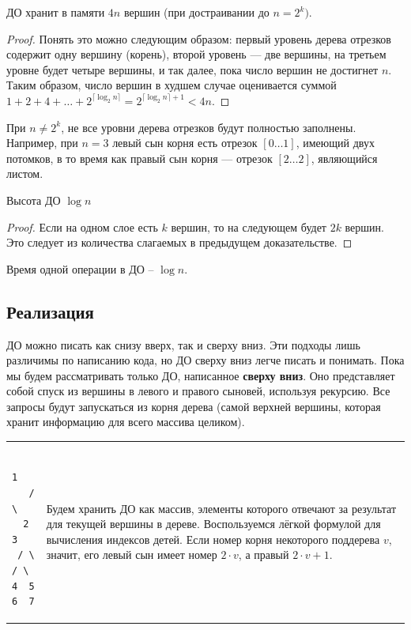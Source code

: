 \begin{Thm}\label{thm@splay}
	ДО хранит в памяти $4n$ вершин (при достраивании до $n=2^k)$.\end{Thm}
\begin{proof}
	Понять это можно следующим образом: первый уровень дерева отрезков содержит одну вершину (корень), второй уровень — две вершины, на третьем уровне будет четыре вершины, и так далее, пока число вершин не достигнет $n$. Таким образом, число вершин в худшем случае оценивается суммой 
	$1 + 2 + 4 + \dots + 2^{\lceil\log_2 n\rceil} = 2^{\lceil\log_2 n\rceil + 1} < 4n$.
\end{proof}

\begin{Rem}При $n \ne 2^k$, не все уровни дерева отрезков будут полностью заполнены. Например, при $n=3$ левый сын корня есть отрезок $[0 \ldots 1]$, имеющий двух потомков, в то время как правый сын корня — отрезок $[2 \ldots 2]$, являющийся листом.
\end{Rem}

\begin{Thm}\label{thm@splay}
	Высота ДО $\log n$\end{Thm}
\begin{proof}
	Если на одном слое есть $k$ вершин, то на следующем будет $2k$ вершин.
	Это следует из количества слагаемых в предыдущем доказательстве.
\end{proof}

\begin{Cons}Время одной операции в ДО -- $\log n$.\end{Cons}

\pagebreak
\up\up\up
\subsection{Реализация}

ДО можно писать как снизу вверх, так и сверху вниз. Эти подходы лишь различимы по написанию кода, но ДО сверху вниз легче писать и понимать. Пока мы будем рассматривать только ДО, написанное {\bf сверху вниз}. Оно представляет собой спуск из вершины в левого и правого сыновей, используя рекурсию. Все запросы будут запускаться из корня дерева (самой верхней вершины, которая хранит информацию для всего массива целиком).

\down
\begin{tabular}{m{}m{}}
	\begin{minipage}{\textwidth}
\begin{verbatim}
    1  
   / \
  2   3
 / \ / \
4  5 6  7      
\end{verbatim}
	\end{minipage} 
	&
	Будем хранить ДО как массив, элементы которого отвечают за результат для текущей вершины в дереве.
	Воспользуемся лёгкой формулой для вычисления индексов детей. Если номер корня некоторого поддерева $v$, значит, его левый сын имеет номер $2 \cdot v$, а правый $2 \cdot v + 1$.
\end{tabular}
\down

